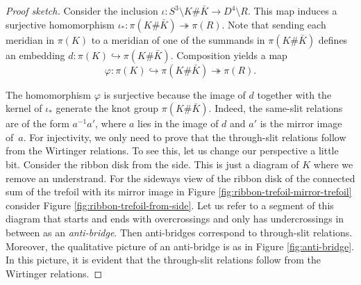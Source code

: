 \documentclass{article}
\theoremstyle{definition}
\begin{document}
\begin{proof}[Proof sketch]
Consider the inclusion $\iota: S^3 \setminus K\#\bar K \rightarrow D^4 \setminus R$. This map induces a surjective homomorphism $\iota_*: \pi(K\#\bar K) \twoheadrightarrow \pi(R)$. Note that sending each meridian in $\pi(K)$ to a meridian of one of the summands in $\pi(K\#\bar K)$ defines an embedding $d: \pi(K) \hookrightarrow \pi(K\#\bar K)$. Composition yields a map 
$$\varphi: \pi(K) \hookrightarrow \pi(K\# \bar K) 
\twoheadrightarrow \pi(R).$$

The homomorphism $\varphi$ is surjective because the image of $d$ together with the kernel of $\iota_*$ generate the knot group $\pi(K\#\bar K)$. Indeed, the same-slit relations are of the form $a^{-1}a'$, where $a$ lies in the image of $d$ and $a'$ is the mirror image of~$a$. For injectivity, we only need to prove that the through-slit relations follow from the Wirtinger relations. To see this, let us change our perspective a little bit. Consider the ribbon disk from the side. This is just a diagram of $K$ where we remove an understrand. For the sideways view of the ribbon disk of the connected sum of the trefoil with its mirror image in Figure \ref{fig:ribbon-trefoil-mirror-trefoil} consider Figure \ref{fig:ribbon-trefoil-from-side}.
Let us refer to a segment of this diagram that starts and ends with overcrossings and only has undercrossings in between as an \textit{anti-bridge}. Then anti-bridges correspond to through-slit relations. Moreover, the qualitative picture of an anti-bridge is as in Figure \ref{fig:anti-bridge}.
In this picture, it is evident that the through-slit relations follow from the Wirtinger relations.
\end{proof}
\end{document}
